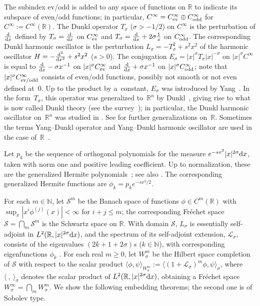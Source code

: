 \documentclass[pdftex]{sigma}
\newcommand{\R}{\mathbb{R}}
\newcommand{\N}{\mathbb{N}}
\newcommand{\LL}{\mathcal{L}}
\renewcommand{\SS}{\mathcal{S}}
\newcommand{\Cinf}{C^\infty}
\begin{document}
The subindex ev/odd is added to any space of functions on $\R$ to indicate its subspace of even/odd functions; in particular, $\Cinf=\Cinf_{\text{\rm ev}}\oplus\Cinf_{\text{\rm odd}}$ for $\Cinf:=\Cinf(\R)$. The Dunkl operator $T_\sigma$ ($\sigma>-1/2$) on $\Cinf$ is the perturbation of $\frac{{\rm d}}{{\rm d}x}$ def\/ined by $T_\sigma=\frac{{\rm d}}{{\rm d}x}$ on $\Cinf_{\text{\rm ev}}$ and $T_\sigma=\frac{{\rm d}}{{\rm d}x}+2\sigma\frac{1}{x}$ on $\Cinf_{\text{\rm odd}}$. The corresponding Dunkl harmonic oscillator is the perturbation $L_\sigma=-T_\sigma^2+s^2x^2$ of the harmonic oscillator $H=-\frac{{\rm d}^2}{{\rm d}x^2}+s^2x^2$ ($s>0$). The conjugation $E_\sigma=|x|^\sigma T_\sigma|x|^{-\sigma}$ on $|x|^\sigma\Cinf$ is equal to $\frac{{\rm d}}{{\rm d}x}-\sigma x^{-1}$ on $|x|^\sigma\Cinf_{\text{\rm ev}}$ and $\frac{{\rm d}}{{\rm d}x}+\sigma x^{-1}$ on $|x|^\sigma\Cinf_{\text{\rm odd}}$; note that $|x|^\sigma\Cinf_{\text{\rm ev/odd}}$ consists of even/odd functions, possibly not smooth or not even def\/ined at~$0$. Up to the product by a~constant, $E_\sigma$ was introduced by Yang~\cite{Yang1951}. In the form~$T_\sigma$, this operator was generalized to~$\R^n$ by Dunkl~\cite{Dunkl1988,Dunkl1989,Dunkl1991}, giving rise to what is now called Dunkl theory (see the survey~\cite{Rosler2003}); in particular, the Dunkl harmonic oscillator on~$\R^n$ was studied in \cite{Dunkl2002,NowakStempak2009b,NowakStempak2009a, Rosenblum1994}. See \cite{Plyushchay2000} for further generalizations on~$\R$. Sometimes the terms Yang--Dunkl operator and Yang--Dunkl harmonic oscillator are used in the case of~$\R$~\cite{Plyushchay2000}.

Let $p_k$ be the sequence of orthogonal polynomials for the measure $e^{-sx^2}|x|^{2\sigma}{\rm d}x$, taken with norm one and positive leading coef\/f\/icient. Up to normalization, these are the generalized Hermite polynomials~\cite[p.~380, Problem~25]{Szego1975}; see also \cite{Chihara1955,Chihara1978,DickinsonWarsi1963,DuttaChatterjeaMore1975,Rosenblum1994,Rosler1998}. The corresponding generalized Hermite functions are $\phi_k=p_ke^{-sx^2/2}$.

For each $m\in\N$, let $\SS^m$ be the Banach space of functions $\phi\in C^m(\R)$ with \mbox{$\sup_x|x^i\phi^{(j)}(x)|\!<\!\infty$} for $i+j\le m$; the corresponding Fr\'echet space $\SS=\bigcap_m\SS^m$ is the Schwartz space on $\R$. With domain $\SS$, $L_\sigma$ is essentially self-adjoint in $L^2(\R,|x|^{2\sigma}{\rm d}x)$, and the spectrum of its self-adjoint extension, $\LL_\sigma$, consists of the eigenvalues $(2k+1+2\sigma)s$ ($k\in\N$), with corresponding eigenfunctions $\phi_k$  \cite{Rosenblum1994}. For each real $m\ge0$, let $W_\sigma^m$ be the Hilbert space completion of $\SS$ with respect to the scalar product $\langle\phi,\psi\rangle_{W_\sigma^m}:=\langle(1+\LL_\sigma)^m\phi,\psi\rangle_\sigma$, where $\langle\ ,\ \rangle_\sigma$ denotes the scalar product of $L^2(\R,|x|^{2\sigma}{\rm d}x)$, obtaining a Fr\'echet space $W_\sigma^\infty=\bigcap_mW_\sigma^m$. We show the following embedding theorems; the second one is of Sobolev type.
\end{document}
